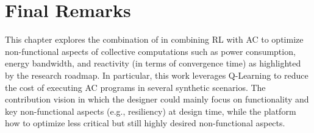 \section{Final Remarks}\label{acsos2022:sec:conclusion}

This chapter explores the combination of in combining \ac{RL} with \ac{AC} 
 to optimize non-functional aspects of collective computations such as power consumption, 
 energy bandwidth, and reactivity (in terms of convergence time) as highlighted by 
 the research roadmap. 
%
In particular, this work leverages Q-Learning 
 to reduce the cost of executing \ac{AC} programs 
 in several synthetic scenarios.
%
The contribution  vision in which 
 the designer could mainly focus on functionality and key non-functional aspects (e.g., resiliency)
 at design time, while the platform  how 
 to optimize less critical but still highly desired non-functional aspects. %


